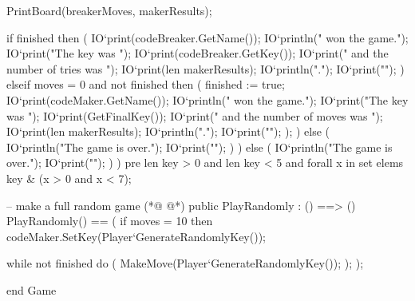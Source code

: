 \begin{vdmpp}[breaklines=true]
       PrintBoard(breakerMoves, makerResults);
       
       if finished
        then (
         IO`print(codeBreaker.GetName());
         IO`println(" won the game.");
         IO`print("The key was ");
         IO`print(codeBreaker.GetKey());
         IO`print(" and the number of tries was ");
         IO`print(len makerResults);
         IO`println(".");
         IO`print("\n");
        )
       elseif moves = 0 and not finished 
        then (
         finished := true;
         IO`print(codeMaker.GetName());
         IO`println(" won the game.");
         IO`print("The key was ");
         IO`print(GetFinalKey());
         IO`print(" and the number of moves was ");
         IO`print(len makerResults);
         IO`println(".");
         IO`print("\n");
        );
      )
     else (
      IO`println("The game is over.");
      IO`print("\n");
     )
    )
   else (
    IO`println("The game is over.");
    IO`print("\n");
   )
  )
  pre len key > 0 and len key < 5 and forall x in set elems key & (x > 0 and x < 7);
  
  -- make a full random game
(*@
\label{PlayRandomly:182}
@*)
  public PlayRandomly : () ==> ()
   PlayRandomly() == (
    if moves = 10
     then
      codeMaker.SetKey(Player`GenerateRandomlyKey());
   
    while not finished do (
     MakeMove(Player`GenerateRandomlyKey());
    );
   );
   
end Game
\end{vdmpp}
